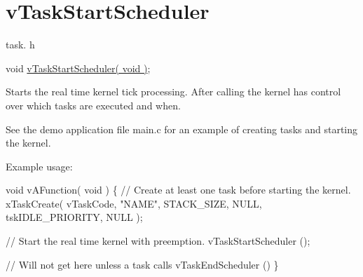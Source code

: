 \hypertarget{group__vTaskStartScheduler}{}\section{v\+Task\+Start\+Scheduler}
\label{group__vTaskStartScheduler}
task. h 
\begin{DoxyPre}void \hyperlink{task_8h_aaf9dca1065c60abdeb309d56ab7293cb}{vTaskStartScheduler( void )};\end{DoxyPre}


Starts the real time kernel tick processing. After calling the kernel has control over which tasks are executed and when.

See the demo application file main.\+c for an example of creating tasks and starting the kernel.

Example usage\+: 
\begin{DoxyPre}
void vAFunction( void )
\{
    // Create at least one task before starting the kernel.
    xTaskCreate( vTaskCode, "NAME", STACK\_SIZE, NULL, tskIDLE\_PRIORITY, NULL );\end{DoxyPre}



\begin{DoxyPre}    // Start the real time kernel with preemption.
    vTaskStartScheduler ();\end{DoxyPre}



\begin{DoxyPre}    // Will not get here unless a task calls vTaskEndScheduler ()
\}
  \end{DoxyPre}
 